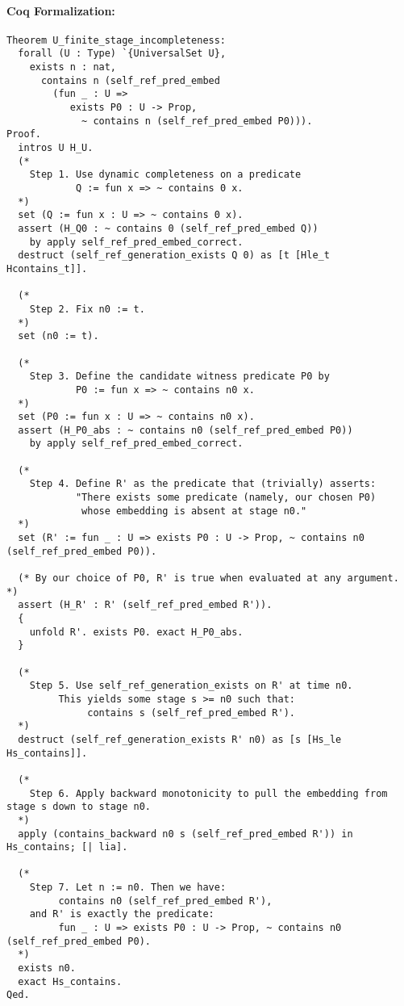 \documentclass[12pt]{article}
\begin{document}
\paragraph{Coq Formalization:}
\begin{lstlisting}[language=Coq]
Theorem U_finite_stage_incompleteness:
  forall (U : Type) `{UniversalSet U},
    exists n : nat,
      contains n (self_ref_pred_embed
        (fun _ : U =>
           exists P0 : U -> Prop,
             ~ contains n (self_ref_pred_embed P0))).
Proof.
  intros U H_U.
  (*
    Step 1. Use dynamic completeness on a predicate 
            Q := fun x => ~ contains 0 x.
  *)
  set (Q := fun x : U => ~ contains 0 x).
  assert (H_Q0 : ~ contains 0 (self_ref_pred_embed Q))
    by apply self_ref_pred_embed_correct.
  destruct (self_ref_generation_exists Q 0) as [t [Hle_t Hcontains_t]].
  
  (*
    Step 2. Fix n0 := t.
  *)
  set (n0 := t).

  (*
    Step 3. Define the candidate witness predicate P0 by 
            P0 := fun x => ~ contains n0 x.
  *)
  set (P0 := fun x : U => ~ contains n0 x).
  assert (H_P0_abs : ~ contains n0 (self_ref_pred_embed P0))
    by apply self_ref_pred_embed_correct.

  (*
    Step 4. Define R' as the predicate that (trivially) asserts:
            "There exists some predicate (namely, our chosen P0) 
             whose embedding is absent at stage n0."
  *)
  set (R' := fun _ : U => exists P0 : U -> Prop, ~ contains n0 (self_ref_pred_embed P0)).

  (* By our choice of P0, R' is true when evaluated at any argument. *)
  assert (H_R' : R' (self_ref_pred_embed R')).
  {
    unfold R'. exists P0. exact H_P0_abs.
  }

  (*
    Step 5. Use self_ref_generation_exists on R' at time n0.
         This yields some stage s >= n0 such that:
              contains s (self_ref_pred_embed R').
  *)
  destruct (self_ref_generation_exists R' n0) as [s [Hs_le Hs_contains]].

  (*
    Step 6. Apply backward monotonicity to pull the embedding from stage s down to stage n0.
  *)
  apply (contains_backward n0 s (self_ref_pred_embed R')) in Hs_contains; [| lia].

  (*
    Step 7. Let n := n0. Then we have:
         contains n0 (self_ref_pred_embed R'),
    and R' is exactly the predicate:
         fun _ : U => exists P0 : U -> Prop, ~ contains n0 (self_ref_pred_embed P0).
  *)
  exists n0.
  exact Hs_contains.
Qed.
\end{lstlisting}
\end{document}
